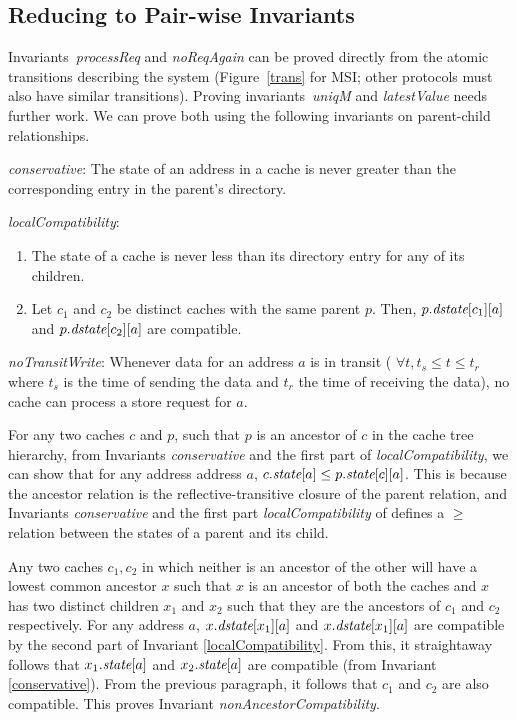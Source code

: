 \subsection{Reducing to Pair-wise Invariants}
\label{pairwise}

Invariants~\textit{processReq} and \textit{noReqAgain} can be proved directly
from the atomic transitions describing the system (Figure~\ref{trans} for MSI;
other protocols must also have similar transitions). Proving
invariants~\textit{uniqM} and \textit{latestValue} needs further work. We can
prove both using the following invariants on parent-child relationships.

\begin{inv}
\textit{conservative}: The state of an address in a cache is never greater than
the corresponding entry in the parent's directory.
\label{conservative}
\end{inv}

\begin{inv}
\textit{localCompatibility}:
\begin{enumerate}
\item The state of a cache is never less than its directory entry for any of
its children.
\item Let $c_1$ and $c_2$ be distinct caches with the same parent $p$. Then,
$p.\textit{dstate}[c_1][a]$ and $p.\textit{dstate}[c_2][a]$ are compatible.
\end{enumerate}
\label{localCompatibility}
\end{inv}

\begin{inv}
\textit{noTransitWrite}: Whenever data for an address $a$ is in transit (\ie{}
$\forall t, t_s \le t \le t_r$ where $t_s$ is the time of sending the data and
$t_r$ the time of receiving the data), no cache can process a store request for
$a$.
\label{noTransitWrite}
\end{inv}

For any two caches $c$ and $p$, such that $p$ is an ancestor of $c$ in the
cache tree hierarchy, from Invariants \textit{conservative} and the first part
of \textit{localCompatibility}, we can show that for any address address $a$,
$c.\textit{state}[a] \le p.\textit{state}[c][a]$. This is because the ancestor relation is the
reflective-transitive closure of the parent relation, and Invariants
\textit{conservative} and the first part \textit{localCompatibility} of defines
a $\ge$ relation between the states of a parent and its child.

Any two caches $c_1, c_2$ in which neither is an ancestor of the other will
have a lowest common ancestor $x$ such that $x$ is an ancestor of both the
caches and $x$ has two distinct children $x_1$ and $x_2$ such that they are the
ancestors of $c_1$ and $c_2$ respectively. For any address $a$,
$x.\textit{dstate}[x_1][a]$ and $x.\textit{dstate}[x_1][a]$ are compatible by the second part
of Invariant \ref{localCompatibility}. From this, it straightaway follows that
$x_1.\textit{state}[a]$ and $x_2.\textit{state}[a]$ are compatible (from Invariant
\ref{conservative}). From the previous paragraph, it follows that $c_1$ and
$c_2$ are also compatible. This proves Invariant \textit{nonAncestorCompatibility}.


